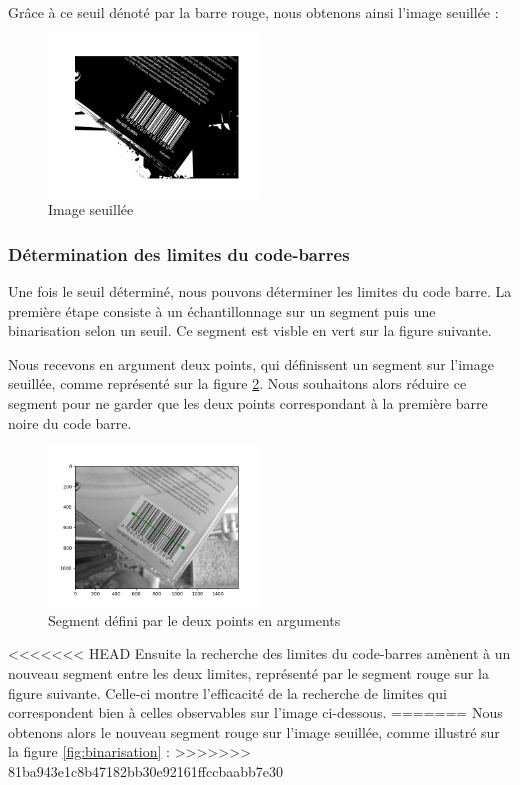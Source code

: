 \documentclass{rapport}
\begin{document}
Grâce à ce seuil dénoté par la barre rouge, nous obtenons ainsi l'image seuillée : 
\begin{figure}[H] 
	\centering
	\includegraphics[width=0.5\textwidth]{images/barcode_seuillee.png}
	\caption{Image seuillée}
	\label{img_seuillee}
\end{figure}

\subsubsection*{Détermination des limites du code-barres}
Une fois le seuil déterminé, nous pouvons déterminer les limites du code barre.
La première étape consiste à un échantillonnage sur un segment puis une binarisation selon un seuil. Ce segment est visble en vert sur la figure suivante.

Nous recevons en argument deux points, qui définissent un segment sur l'image seuillée, comme représenté sur la figure \ref{fig:segment}.
Nous souhaitons alors réduire ce segment pour ne garder que les deux points correspondant à la première barre noire du code barre.

\begin{figure}[H] 
	\centering
	\includegraphics[width=0.5\textwidth]{images/code_barre_couple_vert.png}
	\caption{Segment défini par le deux points en arguments}
	\label{fig:segment}
\end{figure}

<<<<<<< HEAD
Ensuite la recherche des limites du code-barres amènent à un nouveau segment entre les deux limites, représenté par le segment rouge sur la figure suivante. Celle-ci montre l'efficacité
de la recherche de limites qui correspondent bien à celles observables sur l'image ci-dessous.
=======
Nous obtenons alors le nouveau segment rouge sur l'image seuillée, comme illustré sur la figure \ref{fig:binarisation} : 
>>>>>>> 81ba943e1c8b47182bb30e92161ffccbaabb7e30
\end{document}
